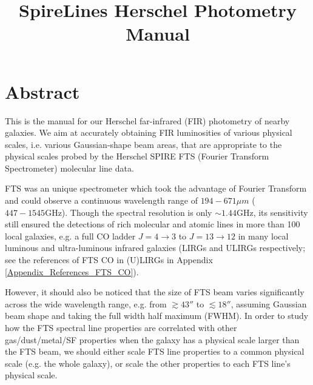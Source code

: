 \documentclass[11pt,a4paper]{article}
\author{}
\title{{\fontspec{Overlock SC}SpireLines} Herschel Photometry Manual}
\begin{document}
\maketitle
\tableofcontents
\clearpage
\setlength{\baselineskip}{16pt}
\setlength{\parskip}{5pt}

\section{Abstract}

This is the manual for our Herschel far-infrared (FIR) photometry of nearby galaxies. We aim at accurately obtaining FIR luminosities of various physical scales, i.e. various Gaussian-shape beam areas, that are appropriate to the physical scales probed by the Herschel SPIRE FTS (Fourier Transform Spectrometer) molecular line data. 

FTS was an unique spectrometer which took the advantage of Fourier Transform and could observe a continuous wavelength range of $194 - 671 {\mu}m$ ($447 - 1545 \mathrm{GHz}$). Though the spectral resolution is only $\sim 1.44 \mathrm{GHz}$, its sensitivity still ensured the detections of rich molecular and atomic lines in more than 100 local galaxies, e.g. a full CO ladder $J=4\to3$ to $J=13\to12$ in many local luminous and ultra-luminous infrared galaxies (LIRGs and ULIRGs respectively; see the references of FTS CO in (U)LIRGs in Appendix \ref{Appendix_References_FTS_CO}). 

However, it should also be noticed that the size of FTS beam varies significantly across the wide wavelength range, e.g. from $\gtrsim43''$ to $\lesssim18''$, assuming Gaussian beam shape and taking the full width half maximum (FWHM). In order to study how the FTS spectral line properties are correlated with other gas/dust/metal/SF properties when the galaxy has a physical scale larger than the FTS beam, we should either scale FTS line properties to a common physical scale (e.g. the whole galaxy), or scale the other properties to each FTS line's physical scale. 
\end{document}
